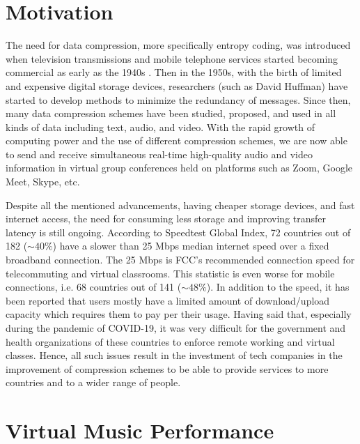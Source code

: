 \label{chapter:introduction}

\section{Motivation}

The need for data compression, more specifically entropy coding, was introduced when television transmissions and mobile telephone services started becoming commercial as early as the 1940s \cite{Shannon1948Bell}. Then in the 1950s, with the birth of limited and expensive digital storage devices, researchers (such as David Huffman) have started to develop methods to minimize the redundancy of messages\cite{Huffman1952IRE}. Since then, many data compression schemes have been studied, proposed, and used in all kinds of data including text, audio, and video. With the rapid growth of computing power and the use of different compression schemes, we are now able to send and receive simultaneous real-time high-quality audio and video information in virtual group conferences held on platforms such as Zoom, Google Meet, Skype, etc.

Despite all the mentioned advancements, having cheaper storage devices, and fast internet access, the need for consuming less storage and improving transfer latency is still ongoing. According to Speedtest Global Index, 72 countries out of 182 ($\sim 40\%$) have a slower than 25 Mbps median internet speed over a fixed broadband connection\cite{speedtest}. The 25 Mbps is FCC's recommended connection speed for telecommuting and virtual classrooms\cite{FCC_broadband_2011}. This statistic is even worse for mobile connections, i.e. 68 countries out of 141 ($\sim 48\%$). In addition to the speed, it has been reported that users mostly have a limited amount of download/upload capacity which requires them to pay per their usage. Having said that, especially during the pandemic of COVID-19, it was very difficult for the government and health organizations of these countries to enforce remote working and virtual classes. Hence, all such issues result in the investment of tech companies in the improvement of compression schemes to be able to provide services to more countries and to a wider range of people.

\section{Virtual Music Performance}
\label{sec:virtual-music-performance}

